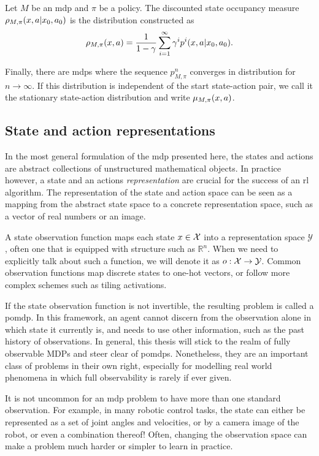 \begin{definition}
    Let $M$ be an \ac{mdp} and $\pi$ be a policy.
    The discounted state occupancy measure $\rho_{M,\pi}(x,a|x_0,a_0)$ is the distribution constructed as $$\rho_{M,\pi}(x,a) = \frac{1}{1 - \gamma} \sum_{i=1}^\infty \gamma^i p^i(x,a|x_0,a_0).$$
\end{definition}

Finally, there are \acp{mdp} where the sequence $p^n_{M,\pi}$ converges in distribution for $n \rightarrow \infty$.
If this distribution is independent of the start state-action pair, we call it the stationary state-action distribution and write $\mu_{M,\pi}(x,a)$.

\subsection{State and action representations}

In the most general formulation of the \ac{mdp} presented here, the states and actions are abstract collections of unstructured mathematical objects.
In practice however, a state and an actions \emph{representation} are crucial for the success of an \ac{rl} algorithm.
The representation of the state and action space can be seen as a mapping from the abstract state space to a concrete representation space, such as a vector of real numbers or an image.

A state observation function maps each state $x\in\mathcal{X}$ into a representation space $\mathcal{Y}$, often one that is equipped with structure such as $\mathbb{R}^n$.
When we need to explicitly talk about such a function, we will denote it as $o: \mathcal{X} \rightarrow \mathcal{Y}$.
Common observation functions map discrete states to one-hot vectors, or follow more complex schemes such as tiling activations.

If the state observation function is not invertible, the resulting problem is called a \ac{pomdp}.
In this framework, an agent cannot discern from the observation alone in which state it currently is, and needs to use other information, such as the past history of observations.
In general, this thesis will stick to the realm of fully observable MDPs and steer clear of \acp{pomdp}.
Nonetheless, they are an important class of problems in their own right, especially for modelling real world phenomena in which full observability is rarely if ever given.

It is not uncommon for an \ac{mdp} problem to have more than one standard observation.
For example, in many robotic control tasks, the state can either be represented as a set of joint angles and velocities, or by a camera image of the robot, or even a combination thereof!
Often, changing the observation space can make a problem much harder or simpler to learn in practice.

